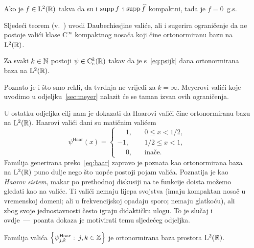 \documentclass[main.tex]{subfiles}
\newcommand{\mr}[1]{\mathrm{#1}}
\begin{document}
\begin{teorem}\label{tm:neodredjenosti}
	Ako je \( f \in \mathrm{L}^2(\mathbb{R}) \) takva da su i \( \operatorname{supp} f \)
	i \( \operatorname{supp} \widehat{f} \) kompaktni, tada je \( f=0 \)~g.s.
\end{teorem}
Sljedeći teorem (v.~\cite{daub2}) uvodi Daubechiesjine valiće, ali i sugerira ograničenje
da ne postoje valići klase \( \mr C^\infty \) kompaktnog nosača
koji čine ortonormiranu bazu na \( \mathrm{L}^2(\mathbb{R}) \).
\begin{teorem}\label{tm:daub}
	Za svaki \( k \in \mathbb{N} \) postoji \( \psi \in \mr C_\mrc ^k(\R) \)
	takav da je s~\eqref{eq:psijk} dana
	ortonormirana baza na \( \mathrm{L}^2(\mathbb{R}) \).
\end{teorem}
Poznato je i što smo rekli, da tvrdnja ne vrijedi za \( k = \infty \).
Meyerovi valići koje uvodimo u odjeljku~\ref{sec:meyer}
nalazit će se taman izvan ovih ograničenja.

\bigskip
\newcommand{\psh}{\psi^{\mathrm{Haar}}}
U ostatku odjeljka cilj nam je dokazati da Haarovi valići čine ortonormiranu bazu
na \( \mathrm{L}^2(\mathbb{R}) \). Haarovi valići dani su matičnim valićem
\begin{equation}\label{eq:haar}
	\psi^{\mathrm{Haar}}(x) = \begin{cases}
		\phantom{-} 1, & \quad  0 \le x < 1/2, \\
		-1,            & \quad  1/2 \le x < 1, \\
		\phantom{-} 0, & \quad  \text{inače}.
	\end{cases}
\end{equation}
Familija generirana preko~\eqref{eq:haar} zapravo je poznata
kao ortonormirana baza na \( \mathrm{L}^2(\mathbb{R}) \) puno dulje nego što uopće postoji pojam valića.
Poznatija je kao \emph{Haarov sistem}, makar po prethodnoj diskusiji na te funkcije
doista možemo gledati kao na valiće. Ti valići nemaju lijepa svojstva (imaju
kompaktan nosač u vremenskoj domeni; ali u frekvencijskoj opadaju sporo;
nemaju glatkoću), ali zbog svoje jednostavnosti često igraju didaktičku ulogu.
To je slučaj i ovdje~---~poanta dokaza je motivirati temu sljedećeg odjeljka.

\begin{teorem}\label{tm:haar}
	Familija valića \( \left\{ \psh_{j,k} \st j,k \in \Z \right\} \)
	je ortonormirana baza prostora \( \mathrm{L}^2(\mathbb{R}) \).
\end{teorem}
\end{document}
